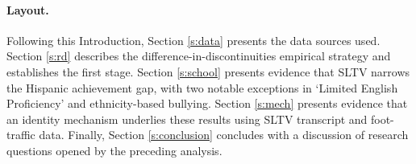 \documentclass[11pt]{article}
\begin{document}







\paragraph{Layout.} Following this Introduction, Section \ref{s:data} presents the data sources used. Section \ref{s:rd} describes the difference-in-discontinuities empirical strategy and establishes the first stage. Section \ref{s:school} presents evidence that SLTV narrows the Hispanic achievement gap, with two notable exceptions in `Limited English Proficiency' and ethnicity-based bullying. Section \ref{s:mech} presents evidence that an identity mechanism underlies these results using SLTV transcript and foot-traffic data. Finally, Section \ref{s:conclusion} concludes with a discussion of research questions opened by the preceding analysis.
\end{document}
